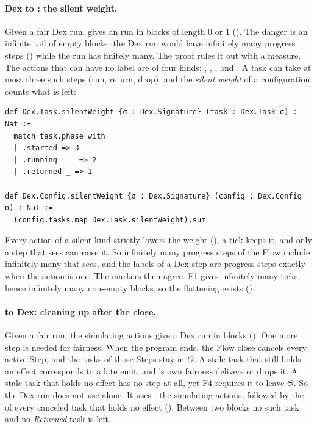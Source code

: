 \paragraph{Dex to \Lang{}: the silent weight.}
Given a fair Dex run,  gives an \Lang{} run in
blocks of length 0 or 1 (). The danger is an infinite
tail of empty blocks: the Dex run would have infinitely many progress steps
(\mdiv) while the \Lang{} run has finitely many. The proof rules it out
with a measure. The actions that can have no \Lang{} label are of four
kinds: , , , and
. A task can take at most three such steps (run,
return, drop), and the \emph{silent weight} of a configuration counts what
is left:

\begin{Verbatim}
def Dex.Task.silentWeight {σ : Dex.Signature} (task : Dex.Task σ) : Nat :=
  match task.phase with
  | .started => 3
  | .running _ _ => 2
  | .returned _ => 1

def Dex.Config.silentWeight {σ : Dex.Signature} (config : Dex.Config σ) : Nat :=
  (config.tasks.map Dex.Task.silentWeight).sum
\end{Verbatim}

Every action of a silent kind strictly lowers the weight
(), a tick keeps it, and only a step
that \Lang{} sees can raise it. So infinitely many progress steps of the
Flow include infinitely many that \Lang{} sees, and the \Lang{} labels of a
Dex step are progress steps exactly when the action is one. The markers
then agree. F1 gives infinitely many ticks, hence infinitely many non-empty
blocks, so the flattening exists ().

\paragraph{\Lang{} to Dex: cleaning up after the close.}
Given a fair \Lang{} run, the simulating actions give a Dex run in blocks
(). One more step is needed for fairness. When the
program ends, the Flow close cancels every active Step, and the tasks of
those Steps stay in $\Theta$. A stale task that still holds an effect
corresponds to a late emit, and \Lang{}'s own fairness delivers or drops
it. A stale task that holds no effect has no \Lang{} step at all, yet F4
requires it to leave $\Theta$. So the Dex run does not use
 alone. It uses : the simulating
actions, followed by the  of every canceled task
that holds no effect (). Between two blocks no such
task and no \emph{Returned} task is left.

